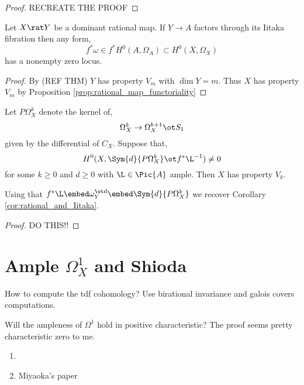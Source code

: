 \documentclass[12pt]{article}
\begin{document}
\begin{proof}
RECREATE THE PROOF
\end{proof}

\begin{cor} \label{cor:rational_and_Iitaka}
Let $X \rat Y$ be a dominant rational map. If $Y \to A$ factors through its Iitaka fibration then any form,
\[ f^* \omega \in f^* H^0(A, \Omega_A) \subset H^0(X, \Omega_X) \]
has a nonempty zero locus.  
\end{cor}

\begin{proof}
By (REF THM) $Y$ has property $V_m$ with $\dim{Y} = m$. Thus $X$ has property $V_m$ by Proposition \ref{prop:rational_map_functoriality}
\end{proof}

\begin{theorem}
Let $P \Omega^k_X$ denote the kernel of,
\[ \Omega^k_X \to \Omega^{k+1}_X \ot S_1 \]
given by the differential of $C_X$. Suppose that,
\[ H^0(X, \Sym{d}{P \Omega^k_X} \ot f^* \L^{-1}) \neq 0 \]
for some $k \ge 0$ and $d \ge 0$ with $\L \in \Pic{A}$ ample. Then $X$ has property $V_k$. 
\end{theorem}

\begin{rmk}
Using that $f^* \L \embed \omega_Y^{\ot d} \embed \Sym{d}{P \Omega^k_X}$ we recover Corollary \ref{cor:rational_and_Iitaka}. 
\end{rmk}

\begin{proof}
DO THIS!!
\end{proof}


\section{Ample $\Omega^1_X$ and Shioda}

How to compute the tdf cohomology? Use birational invariance and galois covers computations.

Will the ampleness of $\Omega^1$ hold in positive characteristic? The proof seems pretty characteristic zero to me.

\begin{enumerate}
\item {}

\item Miyaoka's paper
\end{enumerate}
\end{document}
